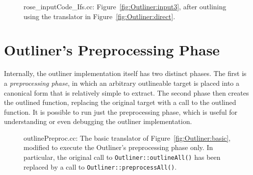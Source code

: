 \begin{figure}[!h]
{\indent
{\mySmallFontSize
\begin{latexonly}
   
\end{latexonly}
\begin{htmlonly}
   
\end{htmlonly}

}
}
\caption{rose\_inputCode\_Ifs.cc: Figure~\ref{fig:Outliner:input3},
after outlining using the translator in
Figure~\ref{fig:Outliner:direct}.}
\label{fig:Outliner:output3}
\end{figure}

\section{Outliner's Preprocessing Phase}
\label{sec:Outliner:preproc}

Internally, the outliner implementation itself has two distinct
phases. The first is a \emph{preprocessing phase}, in which an
arbitrary outlineable target is placed into a canonical form that is
relatively simple to extract. The second phase then creates the
outlined function, replacing the original target with a call to the
outlined function. It is possible to run just the preprocessing phase,
which is useful for understanding or even debugging the outliner
implementation.

\begin{figure}[!h]
{\indent
{\mySmallFontSize
\begin{latexonly}
   
\end{latexonly}
\begin{htmlonly}
   
\end{htmlonly}

}
}
\caption{outlinePreproc.cc: The basic translator of
Figure~\ref{fig:Outliner:basic}, modified to execute the
Outliner's preprocessing phase only.  In particular, the original
call to \texttt{Outliner::outlineAll()} has been replaced by a call
to \texttt{Outliner::preprocessAll()}.}
\label{fig:Outliner:preproc}
\end{figure}

